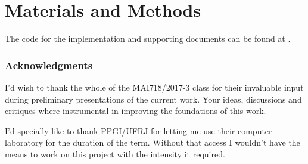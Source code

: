 \documentclass{article} %
\begin{document}
\section{Materials and Methods}\label{materials}
The code for the implementation and supporting documents can be found at \citet{Stelling:aa}.

\subsubsection*{Acknowledgments}
I'd wish to thank the whole of the MAI718/2017-3 class for their invaluable input during preliminary presentations of the current work. Your ideas, discussions and critiques where instrumental in improving the foundations of this work. 

I'd specially like to thank PPGI/UFRJ for letting me use their computer laboratory for the duration of the term. Without that access I wouldn't have the means to work on this project with the intensity it required.



\end{document}
